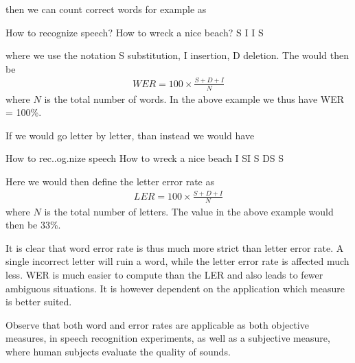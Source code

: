 \documentclass[letterpaper,10pt,english]{jupyterBook}
\begin{document}
\sphinxAtStartPar
then we can count correct words for example as

\begin{sphinxVerbatim}[commandchars=\\\{\}]
How to recognize    speech?
How to wreck a nice beach?
       S     I I    S
\end{sphinxVerbatim}

\sphinxAtStartPar
where we use the notation S \sphinxhyphen{} substitution, I \sphinxhyphen{} insertion, D \sphinxhyphen{} deletion.
The 
would then be
\begin{equation*}
\begin{split} WER = 100\times\frac{S+D+I}{N} \end{split}
\end{equation*}
\sphinxAtStartPar
where \(N\) is the total number of words. In the above example we thus have
WER = 100\%.

\sphinxAtStartPar
If we would go letter by letter, than instead we would have

\begin{sphinxVerbatim}[commandchars=\\\{\}]
How to  rec..og.nize speech
How to wreck a  nice  beach
       I     SI   S  DS S
\end{sphinxVerbatim}

\sphinxAtStartPar
Here we would then define the letter error rate as
\begin{equation*}
\begin{split} LER = 100\times\frac{S+D+I}{N} \end{split}
\end{equation*}
\sphinxAtStartPar
where \(N\) is the total number of letters. The value in the above example
would then be 33\%.

\sphinxAtStartPar
It is clear that word error rate is thus much more strict than letter
error rate. A single incorrect letter will ruin a word, while the letter
error rate is affected much less. WER is much easier to compute than the
LER and also leads to fewer ambiguous situations. It is however
dependent on the application which measure is better suited.

\sphinxAtStartPar
Observe that both word and error rates are applicable as both objective
measures, in speech recognition experiments, as well as a subjective
measure, where human subjects evaluate the quality of sounds.
\end{document}
